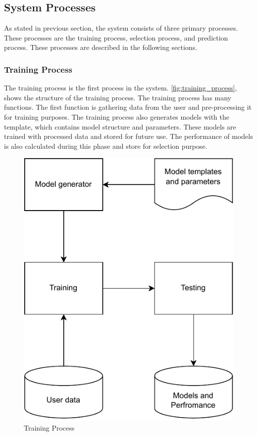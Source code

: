 \documentclass[a4paper,fleqn]{cas-dc}
\begin{document}
\subsection{System Processes}\label{subsec:system_processes}

As stated in previous section, the system consists of three primary processes. These processes are the training process, selection process, and prediction process. These processes are described in the following sections.

\subsubsection{Training Process}\label{subsubsec:training_process}

The training process is the first process in the system. \autoref{fig:training_process}, shows the structure of the training process. The training process has many functions. The first function is gathering data from the user and pre-processing it for training purposes. The training process also generates models with the template, which contains model structure and parameters. These models are trained with processed data and stored for future use. The performance of models is also calculated during this phase and store for selection purpose.

\begin{figure}[ht]
    \centering
    \includegraphics[width=0.6\columnwidth]{training_and_testing.pdf}
    \caption{Training Process}
    \label{fig:training_process}
\end{figure}
\end{document}
